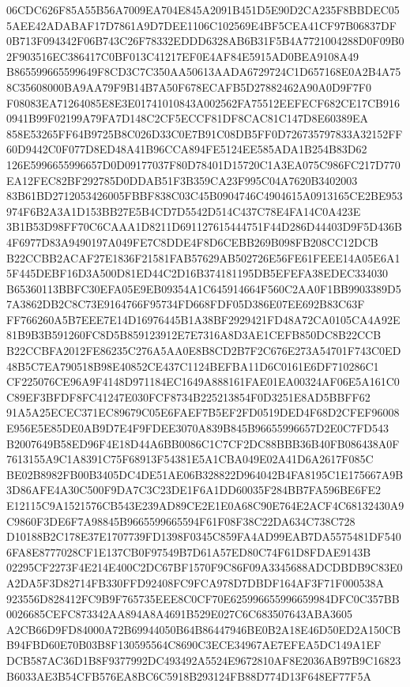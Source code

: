\documentclass[UTF8,fontset=fandol,zihao=-4,a4paper]{ctexart}
\begin{document}
{{06CDC626F85A55B56A7009EA704E845A2091B451D5E90D2CA235F8BBDEC055AEE42ADABAF17D7861A9D7DEE1106C102569E4BF5CEA41CF97B06837DF
0B713F094342F06B743C26F78332EDDD6328AB6B31F5B4A7721004288D0F09B02F903516EC386417C0BF013C41217EF0E4AF84E5915AD0BEA9108A49
B865599665599649F8CD3C7C350AA50613AADA6729724C1D657168E0A2B4A758C35608000BA9AA79F9B14B7A50F678ECAFB5D27882462A90A0D9F7F0
F08083EA71264085E8E3E01741010843A002562FA75512EEFECF682CE17CB9160941B99F02199A79FA7D148C2CF5ECCF81DF8CAC81C147D8E60389EA
858E53265FF64B9725B8C026D33C0E7B91C08DB5FF0D726735797833A32152FF60D9442C0F077D8ED48A41B96CCA894FE5124EE585ADA1B254B83D62
126E5996655996657D0D09177037F80D78401D15720C1A3EA075C986FC217D770EA12FEC82BF292785D0DDAB51F3B359CA23F995C04A7620B3402003
83B61BD2712053426005FBBF838C03C45B0904746C4904615A0913165CE2BE953974F6B2A3A1D153BB27E5B4CD7D5542D514C437C78E4FA14C0A423E
3B1B53D98FF70C6CAAA1D8211D691127615444751F44D286D44403D9F5D436B4F6977D83A9490197A049FE7C8DDE4F8D6CEBB269B098FB208CC12DCB
B22CCBB2ACAF27E1836F21581FAB57629AB502726E56FE61FEEE14A05E6A15F445DEBF16D3A500D81ED44C2D16B374181195DB5EFEFA38EDEC334030
B65360113BBFC30EFA05E9EB09354A1C645914664F560C2AA0F1BB9903389D57A3862DB2C8C73E9164766F95734FD668FDF05D386E07EE692B83C63F
FF766260A5B7EEE7E14D16976445B1A38BF2929421FD48A72CA0105CA4A92E81B9B3B591260FC8D5B859123912E7E7316A8D3AE1CEFB850DC8B22CCB
B22CCBFA2012FE86235C276A5AA0E8B8CD2B7F2C676E273A54701F743C0ED48B5C7EA790518B98E40852CE437C1124BEFBA11D6C0161E6DF710286C1
CF225076CE96A9F4148D971184EC1649A888161FAE01EA00324AF06E5A161C0C89EF3BFDF8FC41247E030FCF8734B225213854F0D3251E8AD5BBFF62
91A5A25ECEC371EC89679C05E6FAEF7B5EF2FD0519DED4F68D2CFEF96008E956E5E85DE0AB9D7E4F9FDEE3070A839B845B96655996657D2E0C7FD543
B2007649B58ED96F4E18D44A6BB0086C1C7CF2DC88BBB36B40FB086438A0F7613155A9C1A8391C75F68913F54381E5A1CBA049E02A41D6A2617F085C
BE02B8982FB00B3405DC4DE51AE06B328822D964042B4FA8195C1E175667A9B3D86AFE4A30C500F9DA7C3C23DE1F6A1DD60035F284BB7FA596BE6FE2
E12115C9A1521576CB543E239AD89CE2E1E0A68C90E764E2ACF4C68132430A9C9860F3DE6F7A98845B9665599665594F61F08F38C22DA634C738C728
D10188B2C178E37E1707739FD1398F0345C859FA4AD99EAB7DA5575481DF5406FA8E8777028CF1E137CB0F97549B7D61A57ED80C74F61D8FDAE9143B
02295CF2273F4E214E400C2DC67BF1570F9C86F09A3345688ADCDBDB9C83E0A2DA5F3D82714FB330FFD92408FC9FCA978D7DBDF164AF3F71F000538A
923556D828412FC9B9F765735EEE8C0CF70E625996655996659984DFC0C357BB0026685CEFC873342AA894A8A4691B529E027C6C683507643ABA3605
A2CB66D9FD84000A72B69944050B64B86447946BE0B2A18E46D50ED2A150CBB94FBD60E70B03B8F130595564C8690C3ECE34967AE7EFEA5DC149A1EF
DCB587AC36D1B8F9377992DC493492A5524E9672810AF8E2036AB97B9C16823B6033AE3B54CFB576EA8BC6C5918B293124FB88D774D13F648EF77F5A
}}
\end{document}
